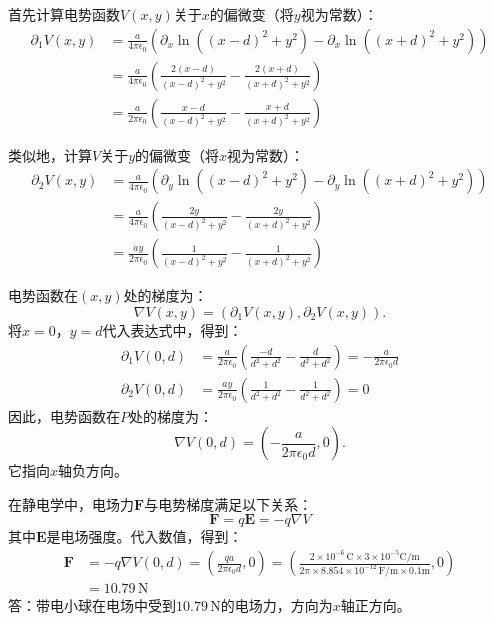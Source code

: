 \documentclass[12pt,UTF8]{ctexbook}
\begin{document}
\begin{so}
首先计算电势函数$V(x,y)$关于$x$的偏微变（将$y$视为常数）：
\begin{align*}
\partial_1 V(x,y) &= \frac{a}{4\pi\epsilon_0} \left( \partial_x \ln{\left( (x-d)^2+y^2\right)} - \partial_x \ln{\left( (x+d)^2+y^2\right)} \right) \\
&= \frac{a}{4\pi\epsilon_0} \left( \frac{2(x-d)}{(x-d)^2+y^2} - \frac{2(x+d)}{(x+d)^2+y^2} \right) \\
&= \frac{a}{2\pi\epsilon_0} \left( \frac{x-d}{(x-d)^2+y^2} - \frac{x+d}{(x+d)^2+y^2} \right)
\end{align*}

类似地，计算$V$关于$y$的偏微变（将$x$视为常数）：
\begin{align*}
\partial_2 V(x,y) &= \frac{a}{4\pi\epsilon_0} \left( \partial_y \ln{\left( (x-d)^2+y^2\right)} - \partial_y \ln{\left( (x+d)^2+y^2\right)} \right) \\
&= \frac{a}{4\pi\epsilon_0} \left( \frac{2y}{(x-d)^2+y^2} - \frac{2y}{(x+d)^2+y^2} \right) \\
&= \frac{a y}{2\pi\epsilon_0} \left( \frac{1}{(x-d)^2+y^2} - \frac{1}{(x+d)^2+y^2} \right)
\end{align*}

电势函数在$(x,y)$处的梯度为：
$$ \nabla V(x,y) = \left(\partial_1 V(x,y), \partial_2 V(x, y)\right).$$
将$x=0$，$y=d$代入表达式中，得到：
\begin{align*}
\partial_1 V(0,d) &= \frac{a}{2\pi\epsilon_0} \left( \frac{-d}{d^2+d^2} - \frac{d}{d^2+d^2} \right) = -\frac{a}{2\pi\epsilon_0 d} \\
\partial_2 V(0,d) &=\frac{a y}{2\pi\epsilon_0} \left( \frac{1}{d^2+d^2} - \frac{1}{d^2+d^2} \right) = 0
\end{align*}
因此，电势函数在$P$处的梯度为：
$$ \nabla V(0,d) = \left( -\frac{a}{2\pi\epsilon_0 d}, 0 \right).$$
它指向$x$轴负方向。

在静电学中，电场力$\mathbf{F}$与电势梯度满足以下关系：
$$ \mathbf{F} = q\mathbf{E} = -q\nabla V $$
其中$\mathbf{E}$是电场强度。代入数值，得到：
\begin{align*}
\mathbf{F} &= -q\nabla V(0,d) = \left( \frac{qa}{2\pi\epsilon_0 d}, 0 \right) =\left( \frac{2\times10^{-6}\,\mathrm{C} \times 3\times10^{-5}\mathrm{C/m} }{2\pi\times 8.854\times10^{-12}\,\mathrm{F/m}\times 0.1\mathrm{m}}, 0 \right)\\
&= 10.79\,\mathrm{N}
\end{align*}
答：带电小球在电场中受到$10.79\,\mathrm{N}$的电场力，方向为$x$轴正方向。
\end{so}
\end{document}
